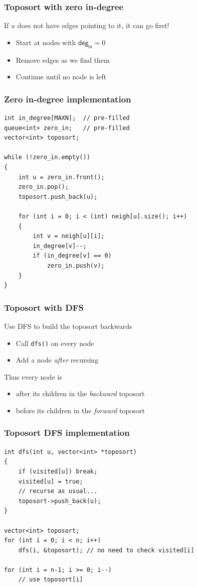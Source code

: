 \documentclass[12pt]{beamer}
\begin{document}
\begin{frame}
\frametitle{Toposort with zero in-degree}
If $u$ does not have edges pointing to it, it can go first!
\begin{itemize}
\item Start at nodes with $\mathsf{deg}_\mathsf{in} = 0$
\item Remove edges as we find them
\item Continue until no node is left
\end{itemize}
\end{frame}

\begin{frame}[fragile]
\frametitle{Zero in-degree implementation}
\begin{lstlisting}
int in_degree[MAXN];  // pre-filled
queue<int> zero_in;   // pre-filled
vector<int> toposort;

while (!zero_in.empty())
{
    int u = zero_in.front();
    zero_in.pop();
    toposort.push_back(u);
    
    for (int i = 0; i < (int) neigh[u].size(); i++)
    {
        int v = neigh[u][i];
        in_degree[v]--;
        if (in_degree[v] == 0)
            zero_in.push(v);
    }
}
\end{lstlisting}
\end{frame}

\begin{frame}
\frametitle{Toposort with DFS}
Use DFS to build the toposort backwards
\begin{itemize}
\item Call \texttt{dfs()} on every node
\item Add a node \emph{after} recursing
\end{itemize}
Thus every node is
\begin{itemize}
\item after its children in the \emph{backward} toposort
\item before its children in the \emph{forward} toposort
\end{itemize}
\end{frame}

\begin{frame}[fragile]
\frametitle{Toposort DFS implementation}
\begin{lstlisting}
int dfs(int u, vector<int> *toposort)
{
    if (visited[u]) break;
    visited[u] = true;
    // recurse as usual...
    toposort->push_back(u);
}

vector<int> toposort;
for (int i = 0; i < n; i++)
    dfs(i, &toposort); // no need to check visited[i]

for (int i = n-1; i >= 0; i--)
    // use toposort[i]
\end{lstlisting}
\end{frame}
\end{document}
